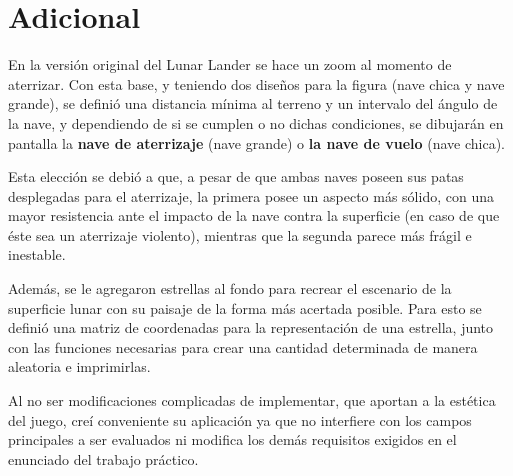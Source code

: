 \documentclass[a4paper, 12pt, spanish]{article}
\begin{document}
\section*{Adicional}
En la versión original del Lunar Lander se hace un zoom al momento de aterrizar. Con esta base, y teniendo dos diseños
para la figura (nave chica y nave grande), se definió una distancia mínima al terreno y un intervalo del ángulo de la nave,
y dependiendo de si se cumplen o no dichas condiciones, se dibujarán en pantalla la \textbf{nave de aterrizaje} (nave grande) 
o \textbf{la nave de vuelo} (nave chica). \bigskip


\bigskip
Esta elección se debió a que, a pesar de que ambas naves poseen sus patas desplegadas para el aterrizaje,
la primera posee un aspecto más sólido, con una mayor resistencia ante el impacto de la nave
contra la superficie (en caso de que éste sea un aterrizaje violento), mientras que la segunda parece más frágil e inestable.
\newline

Además, se le agregaron estrellas al fondo para recrear el escenario de la superficie lunar con su paisaje de la forma más
acertada posible. Para esto se definió una matriz de coordenadas para la representación de una estrella, junto con las funciones necesarias
para crear una cantidad determinada de manera aleatoria e imprimirlas.


\newpage
Al no ser  modificaciones complicadas de implementar, que aportan a la estética del juego, creí conveniente 
su aplicación ya que no interfiere con los campos principales a ser evaluados ni modifica los demás requisitos
exigidos en el enunciado del trabajo práctico.
\end{document}
